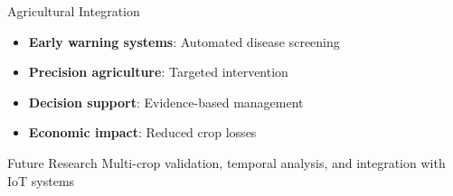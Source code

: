 \documentclass[aspectratio=43]{beamer}
\begin{document}
\begin{frame}
\begin{columns}
\begin{column}{0.5\textwidth}
            \begin{block}{Agricultural Integration}
                \begin{itemize}
                    \item \textbf{Early warning systems}: Automated disease screening
                    \item \textbf{Precision agriculture}: Targeted intervention
                    \item \textbf{Decision support}: Evidence-based management
                    \item \textbf{Economic impact}: Reduced crop losses
                \end{itemize}
            \end{block}
            
            \begin{exampleblock}{Future Research}
                Multi-crop validation, temporal analysis, and integration with IoT systems
            \end{exampleblock}
        \end{column}
    \end{columns}
\end{frame}
\end{document}
